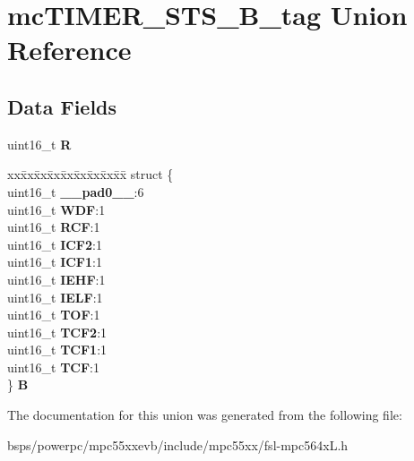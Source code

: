 \hypertarget{unionmcTIMER__STS__16B__tag}{}\section{mc\+T\+I\+M\+E\+R\+\_\+\+S\+T\+S\+\_\+B\+\_\+tag Union Reference}
\label{unionmcTIMER__STS__16B__tag}
\subsection*{Data Fields}
\begin{DoxyCompactItemize}
\item 
\mbox{\label{unionmcTIMER__STS__16B__tag_a121220ea940a3d1ff1d3c3cb949e08b5}} 
uint16\+\_\+t {\bfseries R}
\item 
\mbox{\label{unionmcTIMER__STS__16B__tag_a569b8814e1275d5a5e1a353490ff53d9}} 
\begin{tabbing}
xx\=xx\=xx\=xx\=xx\=xx\=xx\=xx\=xx\=\kill
struct \{\\
\>uint16\_t {\bfseries \_\_pad0\_\_}:6\\
\>uint16\_t {\bfseries WDF}:1\\
\>uint16\_t {\bfseries RCF}:1\\
\>uint16\_t {\bfseries ICF2}:1\\
\>uint16\_t {\bfseries ICF1}:1\\
\>uint16\_t {\bfseries IEHF}:1\\
\>uint16\_t {\bfseries IELF}:1\\
\>uint16\_t {\bfseries TOF}:1\\
\>uint16\_t {\bfseries TCF2}:1\\
\>uint16\_t {\bfseries TCF1}:1\\
\>uint16\_t {\bfseries TCF}:1\\
\} {\bfseries B}\\

\end{tabbing}\end{DoxyCompactItemize}


The documentation for this union was generated from the following file\+:\begin{DoxyCompactItemize}
\item 
bsps/powerpc/mpc55xxevb/include/mpc55xx/fsl-\/mpc564x\+L.\+h\end{DoxyCompactItemize}
